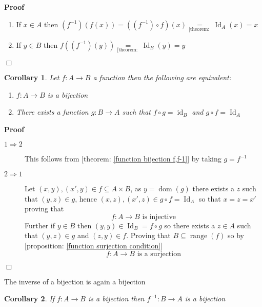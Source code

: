 \documentclass{book}
\newcommand{\equallim}{\mathop{=}\limits}
\newcommand{\tmop}[1]{\ensuremath{\operatorname{#1}}}
\newenvironment{proof}{\noindent\textbf{Proof\ }}{\hspace*{\fill}$\Box$\medskip}
\newtheorem{corollary}{Corollary}
\begin{document}
\begin{proof}
  
  \begin{enumerate}
    \item If $x \in A$ then $(f^{- 1}) (f (x)) = ((f^{- 1}) \circ f) (x)
    \equallim_{\text{[theorem: }} \tmop{Id}_A (x) = x$
    
    \item If $y \in B$ then $f ((f^{- 1}) (y)) \equallim_{\text{[theorem: }}
    \tmop{Id}_B (y) = y$
  \end{enumerate}
\end{proof}

\begin{corollary}
  \label{function bijection condition (2)}Let $f : A \rightarrow B$ a function
  then the following are equivalent:
  \begin{enumerate}
    \item $f : A \rightarrow B$ is a bijection
    
    \item There exists a function $g : B \rightarrow A$ such that $f \circ g =
    \tmop{id}_B$ and $g \circ f = \tmop{Id}_A$
  \end{enumerate}
\end{corollary}

\begin{proof}
  \quad
  \begin{description}
    \item[$1 \Rightarrow 2$] This follows from [theorem: \ref{function
    bijection f,f-1}] by taking $g = f^{- 1}$
    
    \item[$2 \Rightarrow 1$] Let $(x, y), (x', y) \in f \subseteq A \times B$,
    as $y = \tmop{dom} (g)$ there exists a $z$ such that $(y, z) \in g$, hence
    $(x, z), (x', z) \in g \circ f = \tmop{Id}_A$ so that $x = z = x'$ proving
    that
    \[ f : A \rightarrow B \text{ is injective} \]
    Further if $y \in B$ then $(y, y) \in \tmop{Id}_B = f \circ g$ so there
    exists a $z \in A$ such that $(y, z) \in g$ and $(z, y) \in f$. Proving
    that $B \subseteq \tmop{range} (f)$ so by [proposition: \ref{function
    surjection condition}]
    \[ f : A \rightarrow B \text{ is a surjection} \]
  \end{description}
\end{proof}

The inverse of a bijection is again a bijection

\begin{corollary}
  \label{function bijection and inverse}If $f : A \rightarrow B$ is a
  bijection then $f^{- 1} : B \rightarrow A$ is a bijection 
\end{corollary}
\end{document}
